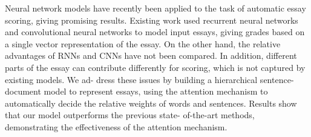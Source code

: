 Neural network models have recently been applied to the task of automatic essay scoring, giving promising results. Existing work used recurrent neural networks and convolutional neural networks to model input essays, giving grades based on a single vector representation of the essay. On the other hand, the relative advantages of RNNs and CNNs have not been compared. In addition, different parts of the essay can contribute differently for scoring, which is not captured by existing models. We ad- dress these issues by building a hierarchical sentence-document model to represent essays, using the attention mechanism to automatically decide the relative weights of words and sentences. Results show that our model outperforms the previous state- of-the-art methods, demonstrating the effectiveness of the attention mechanism.
